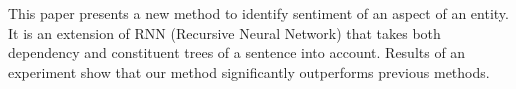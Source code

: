 This paper presents a new method to identify sentiment of an aspect of an entity. It is an extension of RNN (Recursive Neural Network) that takes both dependency and constituent trees of a sentence into account. Results of an experiment show that our method significantly outperforms previous methods.
